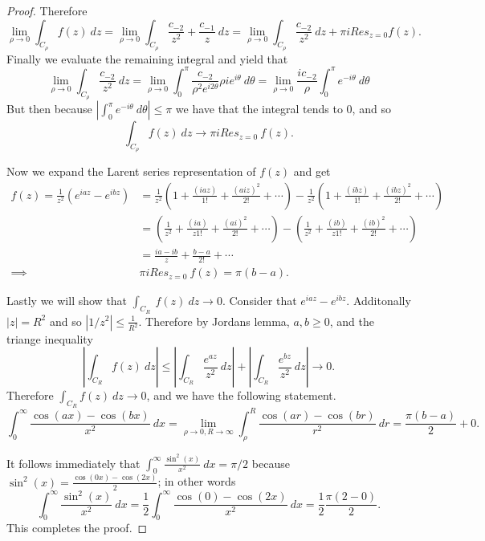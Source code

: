 \documentclass[11pt]{amsart}
\theoremstyle{definition}
\numberwithin{theorem}{section}
\numberwithin{definition}{section}
\numberwithin{equation}{section}
\newcommand{\parens}[1]{ \left( #1 \right) }
\begin{document}
\begin{proof}
	Therefore
	\begin{equation*}
		\lim_{\rho \to 0} \int_{C_\rho} f(z)\ dz = \lim_{\rho \to 0} \int_{C_\rho} \frac{c_{-2}}{z^2} + \frac{c_{-1}}{z}\ dz = \lim_{\rho \to 0} \int_{C_\rho} \frac{c_{-2}}{z^2} \ dz + \pi i Res_{z=0}f(z).
	\end{equation*}
	Finally we evaluate the remaining integral and yield that
	\begin{equation*}
	\lim_{\rho \to 0} \int_{C_\rho} \frac{c_{-2}}{z^2} \ dz = \lim_{\rho \to 0} \int_0^\pi \frac{c_{-2}}{\rho^2 e^{i2\theta}} \rho i e^{i\theta} \ d\theta = \lim_{\rho \to 0} \frac{ic_{-2}}{\rho} \int_0^\pi e^{-i\theta} \ d\theta
	\end{equation*}
	But then because $|\int_0^\pi e^{-i\theta} \ d\theta| \leq \pi$ we have that the integral tends to 0, and so
	\begin{equation*}
		\int_{C_\rho} f(z)\ dz \to \pi i Res_{z=0}\ f(z).
	\end{equation*}

	Now we expand the Larent series representation of $f(z)$ and get
	\begin{equation*}
	\begin{aligned}
		f(z) = \frac{1}{z^2}(e^{iaz} - e^{ibz}) &= \frac{1}{z^2}\parens{1 + \frac{(iaz)}{1!} + \frac{(aiz)^2}{2!} + \cdots} - \frac{1}{z^2}\parens{1 + \frac{(ibz)}{1!} + \frac{(ibz)^2}{2!} + \cdots}\\
		&= \parens{\frac{1}{z^2} + \frac{(ia)}{z1!} + \frac{(ai)^2}{2!} + \cdots} - \parens{\frac{1}{z^2} + \frac{(ib)}{z1!} + \frac{(ib)^2}{2!} + \cdots}\\
		&= \frac{ia-ib}{z} +  \frac{b-a}{2!} + \cdots \\
		\implies& \pi i Res_{z=0}\ f(z) =  \pi(b-a). 
	\end{aligned}
	\end{equation*}

	Lastly we will show that $\int_{C_R}\ f(z)\ dz \to 0.$ Consider that $e^{iaz} - e^{ibz}$. Additonally $|z| = R^2$ and so $|1/z^2| \leq \frac{1}{R^2}$. Therefore by Jordans lemma, $a,b \geq 0$, and the triange inequality
	\begin{equation*}
		\left|\int_{C_R} f(z)\ dz \right|	\leq \left|\int_{C_R} \frac{ e^{az}}{z^2}\ dz \right| + \left|\int_{C_R} \frac{e^{bz}}{z^2}\ dz \right| \to 0.
	\end{equation*}
	Therefore $\int_{C_R} f(z)\ dz \to 0$, and we have the following statement.
	\begin{equation*}
		\int_0^\infty \frac{\cos(ax) - \cos(bx)}{x^2} \ dx =  \lim_{\rho \to 0, R \to \infty} \int_\rho^R \frac{\cos(ar) - \cos(br)}{r^2} \ dr = \frac{ \pi(b-a)}{2} + 0.
	\end{equation*}

	It follows immediately that $\int_0^\infty \frac{\sin^2(x)}{x^2}\ dx = \pi/2$ because $\sin^2 (x) = \frac{\cos(0x) - \cos(2x)}{2}$; in other words
	\begin{equation*}
	\int_0^\infty \frac{\sin^2(x)}{x^2}\ dx = \frac{1}{2}\int_0^\infty \frac{\cos(0) - \cos(2x)}{x^2} \ dx = \frac{1}{2}\frac{\pi(2- 0)}{2}.
	\end{equation*}
	This completes the proof.
\end{proof}
\end{document}

